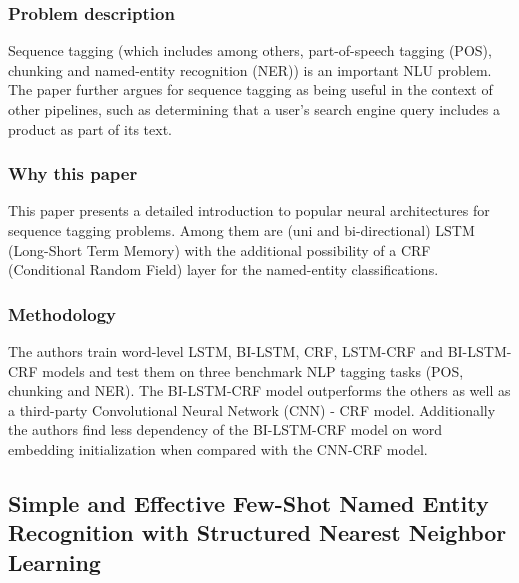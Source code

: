 \documentclass[11pt]{article}
\begin{document}
\subsubsection{Problem description}
Sequence tagging (which includes among others, part-of-speech tagging (POS), chunking and named-entity recognition (NER)) is an important NLU problem. The paper further argues for sequence tagging as being useful in the context of other pipelines, such as determining that a user’s search engine query includes a product as part of its text.
\subsubsection{Why this paper}
This paper presents a detailed introduction to popular neural architectures for sequence tagging problems. Among them are (uni and bi-directional) LSTM (Long-Short Term Memory) with the additional possibility of a CRF (Conditional Random Field) layer for the named-entity classifications.
\subsubsection{Methodology}
The authors train word-level LSTM, BI-LSTM, CRF, LSTM-CRF and BI-LSTM-CRF models and test them on three benchmark NLP tagging tasks (POS, chunking and NER). The BI-LSTM-CRF model outperforms the others as well as a third-party Convolutional Neural Network (CNN) - CRF model. Additionally the authors find less dependency of the BI-LSTM-CRF model on word embedding initialization when compared with the CNN-CRF model. 



\subsection{Simple and Effective Few-Shot Named Entity Recognition with Structured Nearest Neighbor Learning
\citet{yang-katiyar-2020-simple} }
\end{document}

